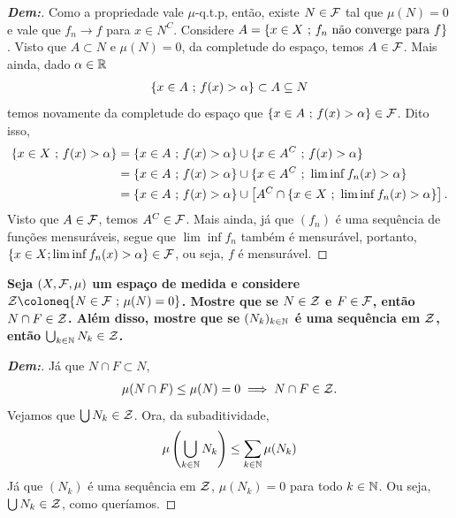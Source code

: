 \begin{proof}[\textbf{Dem:}]Como a propriedade vale $\mu$-q.t.p, então, existe $N \in \mathcal F$ tal que $\mu(N) = 0$ e 
  vale que $f_n \rightarrow f$ para $x \in N^C$. Considere $A = \{x \in X\text{ ; } f_n\text{ não converge para }f\}$. Visto que 
  $A \subset N$ e $\mu(N) = 0$, da completude do espaço, temos $A \in \mathcal F$. Mais ainda, dado $\alpha \in \mathbb R$
  \begin{align*}
    \{x \in A \text{ ; } f(x) > \alpha\} \subset A \subseteq N
  \end{align*}
  temos novamente da completude do espaço que $\{x \in A \text{ ; } f(x)>\alpha\} \in \mathcal F$. Dito isso, 
  \begin{align*}
    \{x \in X \text{ ; } f(x)> \alpha \} &=
    \{x \in A \text{ ; } f(x)>\alpha\}\cup \{x \in A^C \text{ ; } f(x) > \alpha\}\\
    &= \{x \in A \text{ ; } f(x)>\alpha\}\cup \{x \in A^C \text{ ; } \lim \inf f_n(x) > \alpha\}\\
    &= \{x \in A \text{ ; } f(x)>\alpha\}\cup \left[A^C \cap \{x \in X \text{ ; } 
    \lim \inf f_n(x) > \alpha\}\right]. 
  \end{align*}
  Visto que $A \in \mathcal F$, temos $A^C \in \mathcal F$. Mais ainda, já que $(f_n)$ é 
  uma sequência de funções mensuráveis, segue que $\lim \inf f_n$ também é mensurável,
  portanto,
  $\{x \in X; \lim \inf f_n(x)> \alpha\} \in \mathcal F$, 
  ou seja, $f$ é mensurável.
\end{proof}
\biglinend
\newpage
{}
\myexe{\thedois}
\bigline 
\textbf{Seja $(X, \mathcal F, \mu)$ um espaço de medida e considere $\mcal Z\coloneq \{N \in \mcal F\st \mu(N) = 0\}$. 
Mostre que se $N \in \mathcal Z$ e $F \in \mathcal F$, então $N \cap F \in \mathcal Z$. Além disso, mostre que se 
$(N_k)_{k \in \mathbb N}$ é uma sequência em $\mathcal Z$, então $\bigcup_{k \in \mathbb N} N_k \in \mathcal Z$.}
\begin{proof}[\textbf{Dem:}]
 Já que $N \cap F \subset N$, 
  \begin{align*}
    \mu(N \cap F) \le \mu(N) = 0 \implies N\cap F \in \mathcal Z. 
  \end{align*}
  Vejamos que $\bigcup N_k \in \mathcal Z$. Ora, da subaditividade, 
  \begin{align*}
    \mu\left(\bigcup\limits_{k \in \mathbb N} N_k\right) \le \sum_{k \in \mathbb N} \mu(N_k)
  \end{align*}
  Já que $(N_k)$ é uma sequência em $\mathcal Z$, $\mu(N_k) = 0$ para todo $k \in \mathbb N$. Ou seja, 
  $\bigcup N_k \in \mathcal Z$, como queríamos.
\end{proof}
